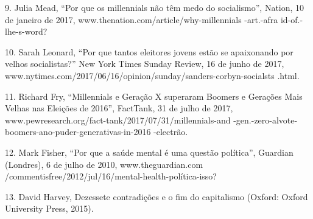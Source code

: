  \par 
9. Julia Mead, “Por que os millennials não têm medo do socialismo”, Nation, {\color{blue}10} de janeiro de 2017, www.thenation.com/article/why-millennials -art.-afra id-of.-lhe-s-word?
 \par 
10. Sarah Leonard, “Por que tantos eleitores jovens estão se apaixonando por velhos socialistas?” New York Times Sunday Review, {\color{blue}16} de junho de 2017, www.nytimes.com/2017/06/16/opinion/sunday/sanders-corbyn-socialsts .html.
 \par 
11. Richard Fry, “Millennials e Geração X superaram Boomers e Gerações Mais Velhas nas Eleições de 2016”, FactTank, {\color{blue}31} de julho de 2017, www.pewresearch.org/fact-tank/2017/07/31/millennials-and -gen.-zero-alvote-boomers-ano-puder-generativas-in-2016 -electrão.
 \par 
12. Mark Fisher, “Por que a saúde mental é uma questão política”, Guardian (Londres), {\color{blue}6} de julho de 2010, www.theguardian.com /commentisfree/2012/jul/16/mental-health-política-isso?
 \par 
13. David Harvey, Dezessete contradições e o fim do capitalismo (Oxford: Oxford University Press, 2015).
 \par 
